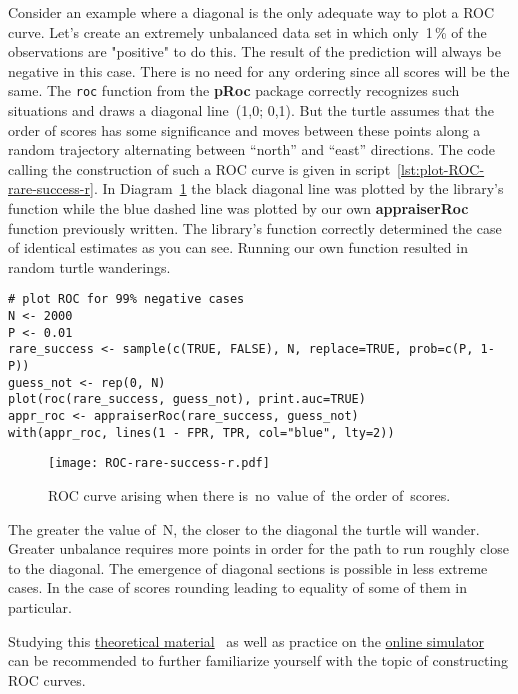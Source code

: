 \documentclass[]{scrreprt}
\begin{document}
Consider an example where a diagonal is the only adequate way to plot a ROC curve. Let's create an extremely unbalanced data set in which only~1\,\% of the observations are "positive" to do this. The result of the prediction will always be negative in this case. There is no need for any ordering since all scores will be the same. The \texttt{roc} function from the \textbf{pRoc} package correctly recognizes such situations and draws a diagonal line~(1,0; 0,1). But the turtle assumes that the order of scores has some significance and moves between these points along a random trajectory alternating between ``north'' and ``east'' directions. The code calling the construction of such a ROC curve is given in script~\ref{lst:plot-ROC-rare-success-r}. In Diagram~\ref{fig:ROC-rare-success-r} the black diagonal line was plotted by the library's function while the blue dashed line was plotted by our own \textbf{appraiserRoc} function previously written. The library's function correctly determined the case of identical estimates as you can see. Running our own function resulted in random turtle wanderings.
%
\begin{lstlisting}[float=htp, caption = Plotting the ROC curve in~case of~absence of~order of~scores, firstnumber=1, label= lst:plot-ROC-rare-success-r]
# plot ROC for 99% negative cases
N <- 2000
P <- 0.01
rare_success <- sample(c(TRUE, FALSE), N, replace=TRUE, prob=c(P, 1-P))
guess_not <- rep(0, N)
plot(roc(rare_success, guess_not), print.auc=TRUE)
appr_roc <- appraiserRoc(rare_success, guess_not)
with(appr_roc, lines(1 - FPR, TPR, col="blue", lty=2))
\end{lstlisting}
%
\begin{figure}[htp]
	\centering
	\texttt{[image: ROC-rare-success-r.pdf]}
	\caption{ROC curve arising when there is~no~value of~the order of~scores.}
	\label{fig:ROC-rare-success-r}
\end{figure}
%

The greater the value of~N, the closer to the diagonal the turtle will wander. Greater unbalance requires more points in order for the path to run roughly close to the diagonal. The emergence of diagonal sections is possible in less extreme cases. In the case of scores rounding leading to equality of some of them in particular.

Studying this \href{https://web.tresorit.com/l/APSpC#AfkTKO5_-ijMhPuXE-qEzg}{theoretical material}~\cite{ROC-analysis} as well as practice on the \href{https://kennis-research.shinyapps.io/ROC-Curves/}{online simulator}~\cite{ROC-curve-practice} can be recommended to further familiarize yourself with the topic of constructing ROC curves.
%
\end{document}

